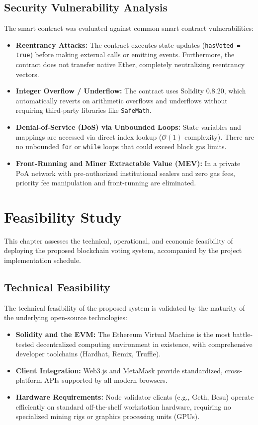\documentclass[12pt,a4paper]{report}
\begin{document}
\section{Security Vulnerability Analysis}
The smart contract was evaluated against common smart contract vulnerabilities:
\begin{itemize}
    \item \textbf{Reentrancy Attacks:} The contract executes state updates (\texttt{hasVoted = true}) before making external calls or emitting events. Furthermore, the contract does not transfer native Ether, completely neutralizing reentrancy vectors.
    \item \textbf{Integer Overflow / Underflow:} The contract uses Solidity 0.8.20, which automatically reverts on arithmetic overflows and underflows without requiring third-party libraries like \texttt{SafeMath}.
    \item \textbf{Denial-of-Service (DoS) via Unbounded Loops:} State variables and mappings are accessed via direct index lookup ($\mathcal{O}(1)$ complexity). There are no unbounded \texttt{for} or \texttt{while} loops that could exceed block gas limits.
    \item \textbf{Front-Running and Miner Extractable Value (MEV):} In a private PoA network with pre-authorized institutional sealers and zero gas fees, priority fee manipulation and front-running are eliminated.
\end{itemize}

\chapter{Feasibility Study}

This chapter assesses the technical, operational, and economic feasibility of deploying the proposed blockchain voting system, accompanied by the project implementation schedule.

\section{Technical Feasibility}
The technical feasibility of the proposed system is validated by the maturity of the underlying open-source technologies:
\begin{itemize}
    \item \textbf{Solidity and the EVM:} The Ethereum Virtual Machine is the most battle-tested decentralized computing environment in existence, with comprehensive developer toolchains (Hardhat, Remix, Truffle).
    \item \textbf{Client Integration:} Web3.js and MetaMask provide standardized, cross-platform APIs supported by all modern browsers.
    \item \textbf{Hardware Requirements:} Node validator clients (e.g., Geth, Besu) operate efficiently on standard off-the-shelf workstation hardware, requiring no specialized mining rigs or graphics processing units (GPUs).
\end{itemize}
\end{document}
